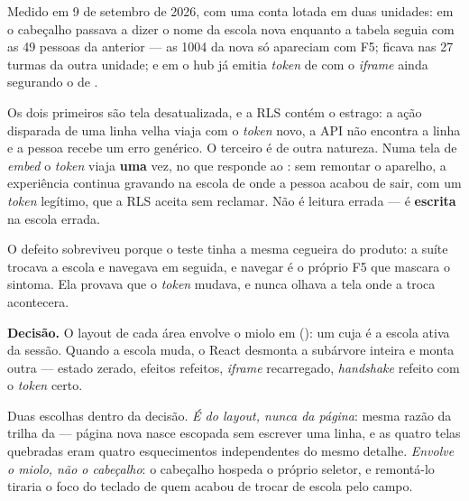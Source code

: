 Medido em 9 de setembro de 2026, com uma conta lotada em duas unidades: em
 o cabeçalho passava a dizer o nome da escola nova
enquanto a tabela seguia com as 49 pessoas da anterior --- as 1004 da nova só
apareciam com F5;  ficava nas 27 turmas da outra unidade; e
em  o hub já emitia \emph{token} de
 com o \emph{iframe} ainda segurando o de .

Os dois primeiros são tela desatualizada, e a RLS contém o estrago: a ação
disparada de uma linha velha viaja com o \emph{token} novo, a API não encontra a
linha e a pessoa recebe um erro genérico. O terceiro é de outra natureza. Numa
tela de \emph{embed} o \emph{token} viaja \textbf{uma} vez, no  que
responde ao : sem remontar o aparelho, a experiência continua
gravando na escola de onde a pessoa acabou de sair, com um \emph{token}
legítimo, que a RLS aceita sem reclamar. Não é leitura errada --- é
\textbf{escrita} na escola errada.

O defeito sobreviveu porque o teste tinha a mesma cegueira do produto: a suíte
 trocava a escola e
navegava em seguida, e navegar é o próprio F5 que mascara o sintoma. Ela provava
que o \emph{token} mudava, e nunca olhava a tela onde a troca acontecera.

\textbf{Decisão.} O layout de cada área envolve o miolo em
 (): um
 cuja  é a escola ativa da sessão. Quando a escola muda, o
React desmonta a subárvore inteira e monta outra --- estado zerado, efeitos
refeitos, \emph{iframe} recarregado, \emph{handshake} refeito com o
\emph{token} certo.

Duas escolhas dentro da decisão. \emph{É do layout, nunca da página}: mesma
razão da trilha da  --- página nova nasce escopada sem escrever uma
linha, e as quatro telas quebradas eram quatro esquecimentos independentes do
mesmo detalhe. \emph{Envolve o miolo, não o cabeçalho}: o cabeçalho hospeda o
próprio seletor, e remontá-lo tiraria o foco do teclado de quem acabou de trocar
de escola pelo campo.

